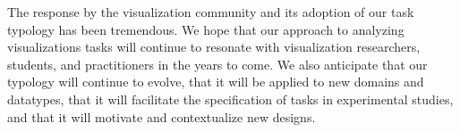 The response by the visualization community and its adoption of our task typology has been tremendous.
We hope that our approach to analyzing visualizations tasks will continue to resonate with visualization researchers, students, and practitioners in the years to come.
We also anticipate that our typology will continue to evolve, that it will be applied to new domains and datatypes, that it will facilitate the specification of tasks in experimental studies, and that it will motivate and contextualize new designs.

\endinput